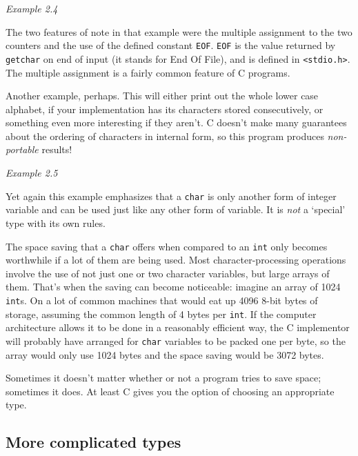    \begin{center}\textit{Example 2.4}\end{center}


   The two features of note in that example were the multiple assignment to
    the two counters and the use of the defined constant \texttt{EOF}.
    \texttt{EOF} is the value returned by \texttt{getchar} on end of
    input (it stands for End Of File), and is defined in
    \texttt{<stdio.h>}. The multiple assignment is a fairly common
    feature of C programs.


   Another example, perhaps. This will either print out the whole lower
    case alphabet, if your implementation has its characters stored
    consecutively, or something even more interesting if they aren't.
    C doesn't make many guarantees about the ordering of characters in
    internal form, so this program produces \textit{non-portable} results!


   \begin{center}\textit{Example 2.5}\end{center}


   Yet again this example emphasizes that a \texttt{char} is only
    another form of integer variable and can be used just like any other form
    of variable. It is \textit{not} a `special' type with its own
    rules.


   The space saving that a \texttt{char} offers when compared to an
    \texttt{int} only becomes worthwhile if a lot of them are being used.
    Most character-processing operations involve the use of not just one or
    two character variables, but large arrays of them. That's when the saving
    can become noticeable: imagine an array of 1024 \texttt{int}s. On
    a lot of common machines that would eat up 4096 8-bit bytes of
    storage, assuming the common length of 4 bytes per \texttt{int}.
    If the computer architecture allows it to be done in a reasonably
    efficient way, the C implementor will probably have arranged for
    \texttt{char} variables to be packed one per byte, so the array would
    only use 1024 bytes and the space saving would be
    3072 bytes.


   Sometimes it doesn't matter whether or not a program tries to save
    space; sometimes it does. At least C gives you the option of choosing an
    appropriate type.


  

  \subsection{More complicated types}
   

